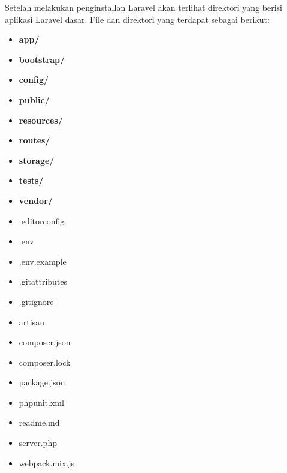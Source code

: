 Setelah melakukan penginstallan Laravel akan terlihat direktori yang berisi aplikasi Laravel dasar. File dan direktori yang terdapat sebagai berikut:\cite{matt:19:laravel}
	\begin{itemize}
		\item[] \textbf{app/}
		\item[] \textbf{bootstrap/}
		\item[] \textbf{config/}
		\item[] \textbf{public/}
		\item[] \textbf{resources/}
		\item[] \textbf{routes/}
		\item[] \textbf{storage/}
		\item[] \textbf{tests/}
		\item[] \textbf{vendor/}
		\item[] .editorconfig
		\item[] .env
		\item[] .env.example
		\item[] .gitattributes
		\item[] .gitignore
		\item[] artisan
		\item[] composer.json
		\item[] composer.lock
		\item[] package.json
		\item[] phpunit.xml
		\item[] readme.md
		\item[] server.php
		\item[] webpack.mix.js
	\end{itemize}
	
